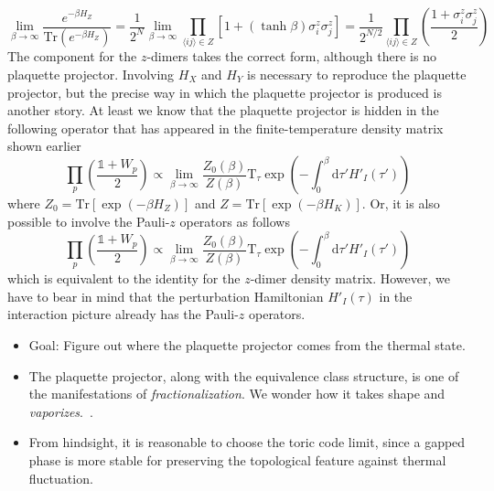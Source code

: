 \documentclass[12font]{article}
\numberwithin{equation}{section}    %
\theoremstyle{definition}
\newcommand{\anglelr}[1]{\langle #1 \rangle}
\newcommand{\lr}[1]{\left(  #1  \right)}
\newcommand{\lrm}[1]{\left[  #1  \right]}
\newcommand{\mrm}[1]{\mathrm{#1}}
\newcommand{\alert}[1]{{\color{red}#1}}
\newcommand{\Tr}{\mrm{Tr}}
\begin{document}
\[
\lim_{\beta \to \infty} \frac{e^{-\beta H_Z}}{\Tr\lr{e^{-\beta H_Z}}} 
= 
\frac{1}{2^N}\lim_{\beta \to \infty}  \prod_{\anglelr{ij}\in Z}\lrm{1 + \lr{\tanh\beta}\sigma^z_i\sigma^z_j}
=
\frac{1}{2^{N/2}}
\prod_{\anglelr{ij}\in Z}\lr{\frac{1 + \sigma^z_i\sigma^z_j}{2}}
\]
The component for the $z$-dimers takes the correct form, although there is no plaquette projector. Involving $H_X$ and $H_Y$ is necessary to reproduce the plaquette projector, but the precise way in which the plaquette projector is produced is another story. At least we know that the plaquette projector is hidden in the following operator that has appeared in the finite-temperature density matrix shown earlier
\begin{equation}\label{eq:plaquette-proj-criterion}
    \prod_p\lr{\frac{\mathds{1} + W_p}{2}}
\propto
\lim_{\beta\to \infty}
\frac{Z_0(\beta)}{Z(\beta)}
\mrm{T}_\tau \exp\lr{-\int_{0}^{\beta}\mrm{d}\tau' H'_I(\tau')}
\end{equation}
where $Z_0 = \Tr\lrm{\exp\lr{-\beta H_Z}}$ and $Z = \Tr\lrm{\exp\lr{-\beta H_K}}$. Or, it is also possible to involve the Pauli-$z$ operators as follows
\begin{equation}\label{eq:plaquette-proj-criterion-2}
    \prod_p\lr{\frac{\mathds{1} + W_p}{2}}
\propto
\lim_{\beta\to \infty}
\frac{Z_0(\beta)}{Z(\beta)}
\mrm{T}_\tau \exp\lr{-\int_{0}^{\beta}\mrm{d}\tau' H'_I(\tau')}
\end{equation}
which is equivalent to the identity for the $z$-dimer density matrix. However, we have to bear in mind that the perturbation Hamiltonian $H'_I(\tau)$ in the interaction picture already has the Pauli-$z$ operators.



\alert{
\begin{itemize}
    \item Goal: Figure out where the plaquette projector comes from the thermal state.
    \item The plaquette projector, along with the equivalence class structure, is one of the manifestations of \textit{fractionalization}. We wonder how it takes shape and \textit{vaporizes}.~\cite{Nasu-Udagawa-Motome_2014}.
    \item From hindsight, it is reasonable to choose the toric code limit, since a gapped phase is more stable for preserving the topological feature against thermal fluctuation.
\end{itemize}
}
\end{document}
